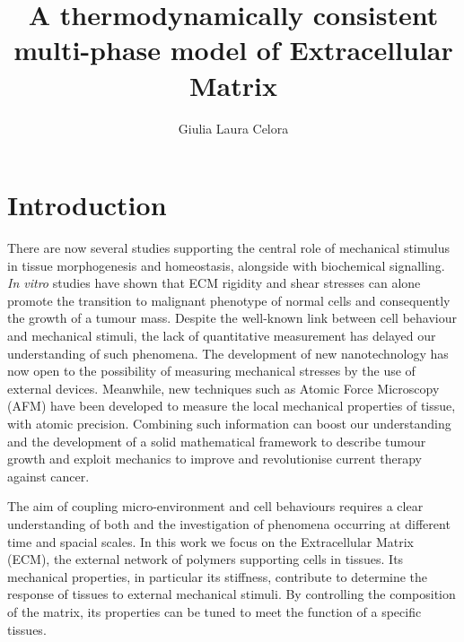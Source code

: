 \documentclass[runningheads]{llncs}
\begin{document}
%
\title{A thermodynamically consistent multi-phase model of Extracellular Matrix}
%
%
\author{Giulia Laura Celora}
%
%
%
\maketitle              %
%
\begin{abstract}

\end{abstract}
%
%
%
\section{Introduction}
There are now several studies supporting the central role of mechanical stimulus in tissue morphogenesis and homeostasis, alongside with biochemical signalling. \textit{In vitro} studies have shown that ECM rigidity and shear stresses can alone promote the transition to malignant phenotype of normal cells and consequently the growth of a tumour mass. Despite the well-known link between cell behaviour and mechanical stimuli, the lack of quantitative measurement has delayed our understanding of such phenomena. The development of new nanotechnology has now open to the possibility of measuring mechanical stresses by the use of external devices. Meanwhile, new techniques such as Atomic Force Microscopy (AFM) have been developed to measure the local mechanical properties of tissue, with atomic precision. Combining such information can boost our understanding and the development of a solid mathematical framework to describe tumour growth and exploit mechanics to improve and revolutionise current therapy against cancer. 

The aim of coupling micro-environment and cell behaviours requires a clear understanding of both and the investigation of phenomena occurring at different time and spacial scales. In this work we focus on the Extracellular Matrix (ECM), the external network of polymers supporting cells in tissues. Its mechanical properties, in particular its stiffness, contribute to determine the response of tissues to external mechanical stimuli. By controlling the composition of the matrix, its properties can be tuned to meet the function of a specific tissues. 
\end{document}
